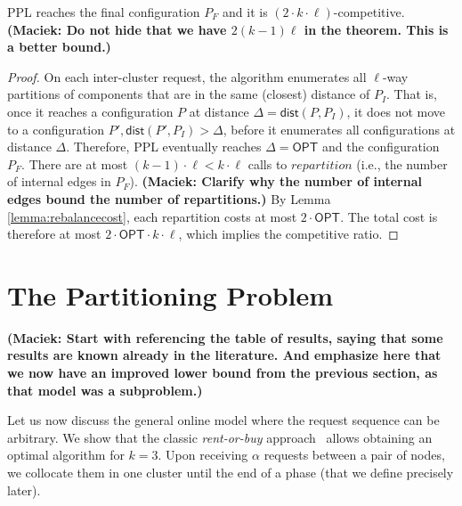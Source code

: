 \documentclass[manuscript,screen=true, review, anonymous]{acmart}
\newcommand{\OPT}{\textsf{OPT}\xspace}
\newcommand{\PPL}{\textsf{PPL}\xspace}
\newcommand{\OBRP}{BRP}
\newcommand{\dist}{\textsf{dist}}
\newcommand\mahmoud[1]{\color{orange}\textbf{Mahmoud: #1~}\color{black}}
\newcommand\maciek[1]{\color{brown}\textbf{(Maciek: #1)}\color{black}}
\begin{document}
\begin{theorem}	\label{thm:upperbound}
	\PPL reaches the final configuration $P_F$ and it is $(2\cdot k\cdot\ell)$-competitive.
	\maciek{Do not hide that we have $2(k-1)\ell$ in the theorem. This is a better bound.}
\end{theorem}
\begin{proof}
	On each inter-cluster request,
	the algorithm enumerates all $\ell$-way partitions of components
	that are in the same (closest) distance of $P_I$.
	That is, 
	once it reaches a configuration $P$ at distance $\Delta = \dist(P, P_I)$,
	it does not move to a configuration
	$P', \dist(P', P_I) > \Delta$,
	before it enumerates all configurations at distance $\Delta$.
	Therefore,
	\PPL eventually reaches $\Delta=\OPT$ and the configuration $P_F$.
	There are at most $(k-1)\cdot\ell < k\cdot\ell $ calls   to $\mathit{repartition}$
	(i.e., the number of internal edges in $P_F$).
	\maciek{Clarify why the number of internal edges bound the number of repartitions.}
	By Lemma \ref{lemma:rebalancecost},
	each repartition costs at most $2\cdot\OPT$.
	The total cost is therefore at most $2\cdot\OPT\cdot k\cdot\ell$, which implies the competitive ratio.
\end{proof}


\section{The Partitioning Problem}
\label{sec:part}



\maciek{Start with referencing the table of results, saying that some results are known already in the literature. And emphasize here that we now have an improved lower bound from the previous section, as that model was a subproblem.}

Let us now discuss the general online
model where the request sequence
can be arbitrary.
We show that the classic \emph{rent-or-buy} approach~\cite{karlin-ski-rental} allows obtaining an optimal algorithm for $k=3$.
Upon receiving $\alpha$ requests between a pair of nodes, we collocate them in one cluster until the end of a phase (that we define precisely later).
\end{document}
